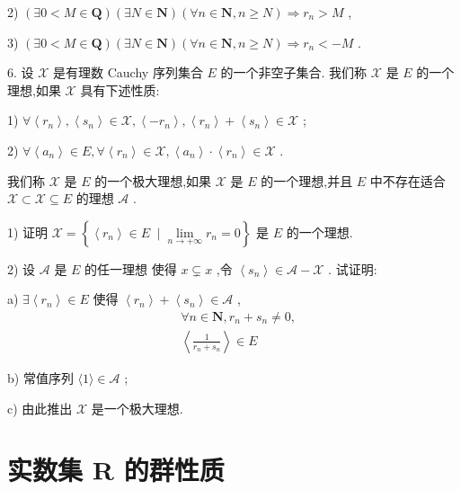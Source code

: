 2) $\left( {\exists 0 < M \in  \mathbf{Q}}\right) \left( {\exists N \in  \mathbf{N}}\right) \left( {\forall n \in  \mathbf{N},n \geq  N}\right)  \Rightarrow  {r}_{n} > M$ ,

3) $\left( {\exists 0 < M \in  \mathbf{Q}}\right) \left( {\exists N \in  \mathbf{N}}\right) \left( {\forall n \in  \mathbf{N},n \geq  N}\right)  \Rightarrow  {r}_{n} <  - M$ .

6. 设 $\mathcal{X}$ 是有理数 Cauchy 序列集合 $E$ 的一个非空子集合. 我们称 $\mathcal{X}$ 是 $E$ 的一个理想,如果 $\mathcal{X}$ 具有下述性质:

1) $\forall \left\langle  {r}_{n}\right\rangle  ,\left\langle  {s}_{n}\right\rangle   \in  \mathcal{X},\left\langle  {-{r}_{n}}\right\rangle  ,\left\langle  {r}_{n}\right\rangle   + \left\langle  {s}_{n}\right\rangle   \in  \mathcal{X}$ ;

2) $\forall \left\langle  {a}_{n}\right\rangle   \in  E,\forall \left\langle  {r}_{n}\right\rangle   \in  \mathcal{X},\left\langle  {a}_{n}\right\rangle   \cdot  \left\langle  {r}_{n}\right\rangle   \in  \mathcal{X}$ .

我们称 $\mathcal{X}$ 是 $E$ 的一个极大理想,如果 $\mathcal{X}$ 是 $E$ 的一个理想,并且 $E$ 中不存在适合 $\mathcal{X} \subset  \mathcal{X} \subseteq  E$ 的理想 $\mathcal{A}$ .

1) 证明 $\mathcal{X} = \left\{  {\left\langle  {r}_{n}\right\rangle   \in  E\; \mid  \mathop{\lim }\limits_{{n \rightarrow   + \infty }}{r}_{n} = 0}\right\}$ 是 $E$ 的一个理想.

2) 设 $\mathcal{A}$ 是 $E$ 的任一理想 使得 $x \subsetneq  x$ ,令 $\left\langle  {s}_{n}\right\rangle   \in  \mathcal{A} - \mathcal{X}$ . 试证明:

a) $\exists \left\langle  {r}_{n}\right\rangle   \in  E$ 使得 $\left\langle  {r}_{n}\right\rangle   + \left\langle  {s}_{n}\right\rangle   \in  \mathcal{A}$ ,
\begin{align*}
	&\forall n \in  \mathbf{N},{r}_{n} + {s}_{n} \neq  0,\\
	&\left\langle  \frac{1}{{r}_{n} + {s}_{n}}\right\rangle   \in  E
\end{align*}

b) 常值序列 $\langle 1\rangle  \in  \mathcal{A}$ ;

c) 由此推出 $\mathcal{X}$ 是一个极大理想.

\section{实数集 $\mathbf{R}$ 的群性质}

